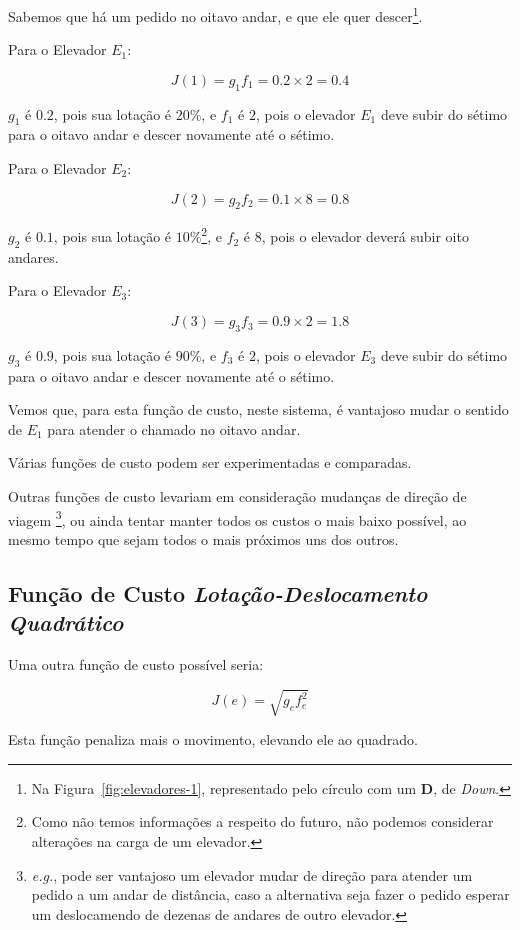 Sabemos que há um pedido no oitavo andar, e que ele quer descer\footnote{Na
  Figura~\ref{fig:elevadores-1}, representado pelo círculo com um \textbf{D}, de
\textit{Down}.}.

Para o Elevador $E_{1}$:

\[J(1) = g_{1}f_{1} = 0.2 \times 2 = 0.4\]

$g_{1}$ é $0.2$, pois sua lotação é $20\%$, e $f_{1}$ é $2$, pois o elevador
$E_{1}$ deve subir do sétimo para o oitavo andar e descer novamente até o sétimo.

Para o Elevador $E_{2}$:

\[J(2) = g_{2}f_{2} = 0.1 \times 8 = 0.8\]

$g_{2}$ é $0.1$, pois sua lotação é $10\%$\footnote{Como não temos informações a
respeito do futuro, não podemos considerar alterações na carga de um elevador.},
e $f_{2}$ é $8$, pois o elevador deverá subir oito andares.

Para o Elevador $E_{3}$:

\[J(3) = g_{3}f_{3} = 0.9 \times 2 = 1.8\]

$g_{3}$ é $0.9$, pois sua lotação é $90\%$, e $f_{3}$ é $2$, pois o elevador
$E_{3}$ deve subir do sétimo para o oitavo andar e descer novamente até o sétimo.

Vemos que, para esta função de custo, neste sistema, é vantajoso mudar o sentido
de $E_{1}$ para atender o chamado no oitavo andar.

Várias funções de custo podem ser experimentadas e comparadas.

Outras funções de custo levariam em consideração mudanças de direção de viagem
\footnote{\textit{e.g.}, pode ser vantajoso um elevador mudar de direção para atender um
pedido a um andar de distância, caso a alternativa seja fazer o pedido esperar
um deslocamendo de dezenas de andares de outro elevador.}, ou ainda tentar
manter todos os custos o mais baixo possível, ao mesmo tempo que sejam todos o
mais próximos uns dos outros.

\subsection{\label{sec:ai:lotacaoquadratica}Função de Custo
\textit{Lotação-Deslocamento Quadrático}}

Uma outra função de custo possível seria:

\[J(e) = \sqrt{g_{e}f_{e}^{2}}\]

Esta função penaliza mais o movimento, elevando ele ao quadrado.


